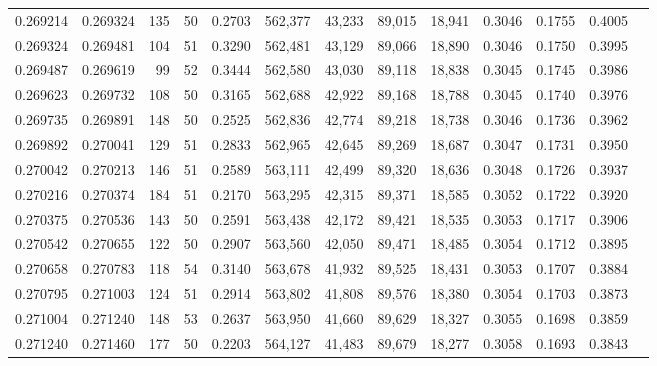 \begin{tabular}{rrrrrrrrrrrrr}
0.269214 & 0.269324 &   135 &  50 &                                     0.2703 & 562,377 &  43,233 &  89,015 &  18,941 & 0.3046 & 0.1755 & 0.4005 \\
0.269324 & 0.269481 &   104 &  51 &                                     0.3290 & 562,481 &  43,129 &  89,066 &  18,890 & 0.3046 & 0.1750 & 0.3995 \\
0.269487 & 0.269619 &    99 &  52 &                                     0.3444 & 562,580 &  43,030 &  89,118 &  18,838 & 0.3045 & 0.1745 & 0.3986 \\
0.269623 & 0.269732 &   108 &  50 &                                     0.3165 & 562,688 &  42,922 &  89,168 &  18,788 & 0.3045 & 0.1740 & 0.3976 \\
0.269735 & 0.269891 &   148 &  50 &                                     0.2525 & 562,836 &  42,774 &  89,218 &  18,738 & 0.3046 & 0.1736 & 0.3962 \\
0.269892 & 0.270041 &   129 &  51 &                                     0.2833 & 562,965 &  42,645 &  89,269 &  18,687 & 0.3047 & 0.1731 & 0.3950 \\
0.270042 & 0.270213 &   146 &  51 &                                     0.2589 & 563,111 &  42,499 &  89,320 &  18,636 & 0.3048 & 0.1726 & 0.3937 \\
0.270216 & 0.270374 &   184 &  51 &                                     0.2170 & 563,295 &  42,315 &  89,371 &  18,585 & 0.3052 & 0.1722 & 0.3920 \\
0.270375 & 0.270536 &   143 &  50 &                                     0.2591 & 563,438 &  42,172 &  89,421 &  18,535 & 0.3053 & 0.1717 & 0.3906 \\
0.270542 & 0.270655 &   122 &  50 &                                     0.2907 & 563,560 &  42,050 &  89,471 &  18,485 & 0.3054 & 0.1712 & 0.3895 \\
0.270658 & 0.270783 &   118 &  54 &                                     0.3140 & 563,678 &  41,932 &  89,525 &  18,431 & 0.3053 & 0.1707 & 0.3884 \\
0.270795 & 0.271003 &   124 &  51 &                                     0.2914 & 563,802 &  41,808 &  89,576 &  18,380 & 0.3054 & 0.1703 & 0.3873 \\
0.271004 & 0.271240 &   148 &  53 &                                     0.2637 & 563,950 &  41,660 &  89,629 &  18,327 & 0.3055 & 0.1698 & 0.3859 \\
0.271240 & 0.271460 &   177 &  50 &                                     0.2203 & 564,127 &  41,483 &  89,679 &  18,277 & 0.3058 & 0.1693 & 0.3843 \\

\end{tabular}
